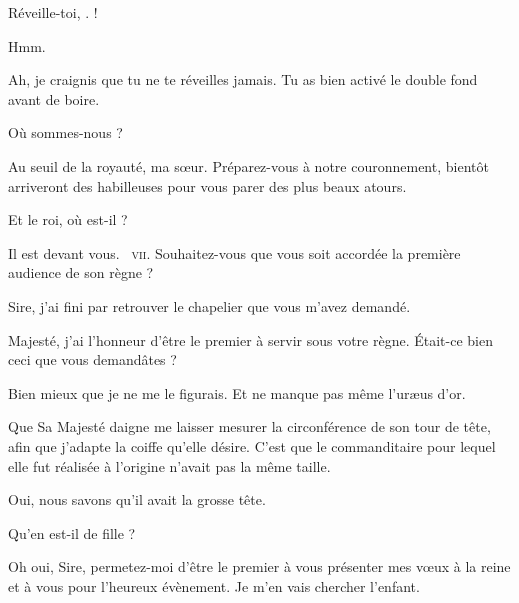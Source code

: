 \begin{drama}
  \elenaspeaks {} Réveille-toi, \ela. \ela !

  \elaspeaks {} Hmm.

  \elenaspeaks Ah, je craignis que tu ne te réveilles jamais. Tu as bien activé le double fond avant de boire.

  \elaspeaks {} Où sommes-nous ?

  \elenaspeaks Au seuil de la royauté, ma sœur. Préparez-vous à notre couronnement, bientôt arriveront des habilleuses pour vous parer des plus beaux atours.

  \elaspeaks Et le roi, où est-il ?

  \elenaspeaks Il est devant vous. \elena~\textsc{vii}. Souhaitez-vous que vous soit accordée la première audience de son règne ?


  \alexasspeaks Sire, j’ai fini par retrouver le chapelier que vous m’avez demandé.

  \chapelierspeaks Majesté, j’ai l’honneur d’être le premier à servir sous votre règne. Était-ce bien ceci que vous demandâtes ?


  \alexasspeaks Bien mieux que je ne me le figurais. Et ne manque pas même l’uræus d’or.

  \chapelierspeaks Que Sa Majesté daigne me laisser mesurer la circonférence de son tour de tête, afin que j’adapte la coiffe qu’elle désire. C’est que le commanditaire pour lequel elle fut réalisée à l’origine n’avait pas la même taille.

  \alexasspeaks Oui, nous savons qu’il avait la grosse tête.


  \exit{\chapelier}


  \elenaspeaks Qu’en est-il de  fille \alexas ? 

  \alexasspeaks Oh oui, Sire, permetez-moi d’être le premier à vous présenter mes vœux à la reine et à vous pour l’heureux évènement. Je m’en vais chercher l’enfant.

  \exit{\alexas}


\end{drama}
